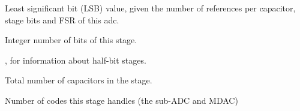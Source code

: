 \documentclass[letterpaper,10pt,english]{sphinxmanual}
\begin{document}
\begin{fulllineitems}

\begin{fulllineitems}
\label{\detokenize{gen:calib.gen.StageMeta.lsb}}
Least significant bit (LSB) value, given the number of references per
capacitor, stage bits and FSR of this adc.

\end{fulllineitems}


\begin{fulllineitems}
\label{\detokenize{gen:calib.gen.StageMeta.n_bits}}
Integer number of bits of this stage.




{\hyperref[\detokenize{gen:calib.gen.StageMeta.half_bit}]{}}, for information about
half-bit stages.



\end{fulllineitems}


\begin{fulllineitems}
\label{\detokenize{gen:calib.gen.StageMeta.n_caps}}
Total number of capacitors in the stage.

\end{fulllineitems}


\begin{fulllineitems}
\label{\detokenize{gen:calib.gen.StageMeta.n_codes}}
Number of codes this stage handles (the sub-ADC and MDAC)

\end{fulllineitems}



\end{fulllineitems}
\end{document}
